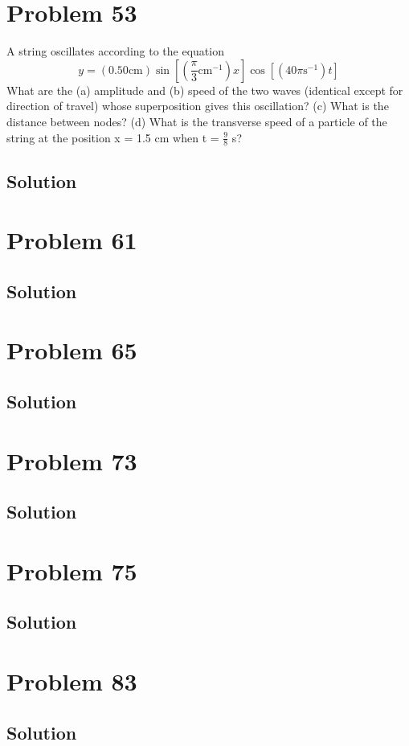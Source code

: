 \documentclass[12pt]{article}
\begin{document}
    \section{Problem 53}
        A string oscillates according to the equation
        \begin{equation}
            y = (0.50 \unit{\centi\meter}) \sin \left[  ( \frac{\pi}{3} \unit{\centi\meter^{-1}})x \right] \cos\left[ (40\pi \unit{\second^{-1}} )t \right]
        \end{equation}
        What are the (a) amplitude and (b) speed of the two waves (identical except for direction of travel) whose superposition gives this oscillation? 
        (c) What is the distance between nodes? 
        (d) What is the transverse speed of a particle of the string at the position x = 1.5 cm when t = $\frac{9}{8}$ s?

        \subsection{Solution}

    \pagebreak
    \section{Problem 61}

        \subsection{Solution}

    \pagebreak
    \section{Problem 65}

        \subsection{Solution}

    \pagebreak
    \section{Problem 73}

        \subsection{Solution}

    \pagebreak
    \section{Problem 75}

        \subsection{Solution}

    \pagebreak
    \section{Problem 83}

        \subsection{Solution}

    \pagebreak

    \tableofcontents
    
\end{document}
